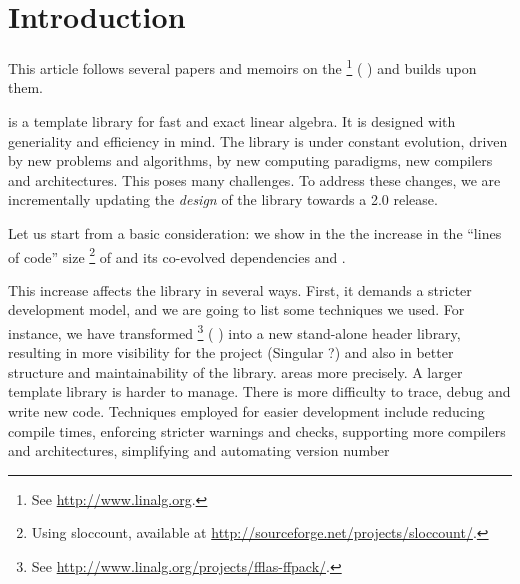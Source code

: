 \section{Introduction}
%
This article follows several papers and memoirs on the \linbox%
%
\footnote{See \url{http://www.linalg.org}.}
%
(\cf{} \cite{Giorgi:2004:these,Turner:2002:these,Boyer:2012:these,Dumas:2002:icms,Dumas:2010:lbpar})
and builds upon them.

\linbox is a \cpp template library for fast and exact linear algebra. It is designed with generiality
and efficiency in mind.
%
%
The \linbox library is under constant evolution, driven by new problems and
algorithms, by new computing paradigms, new compilers and architectures. This
poses many challenges. To address these changes, we are incrementally
updating the \emph{design} of the library towards a \textsf{2.0} release.
%
\par
%
Let us start from a basic consideration: we show in the  the
increase in the ``lines of code'' size
%
\footnote{Using \textsf{sloccount}, available at
\url{http://sourceforge.net/projects/sloccount/}.}
%
of \linbox and its co-evolved dependencies \givaro and \fflasffpack.
%
%

%
This increase affects the library in several ways.  First, it demands a
stricter development model, and we are going to list some techniques we used.
For instance, we have transformed \fflasffpack %
%
\footnote{See \url{http://www.linalg.org/projects/fflas-ffpack/}.}
(\cf{} \cite{Dumas:2008:Flas}) into a new stand-alone header library, resulting
in more visibility for the \fflasffpack project (Singular ?) and also in better
structure and maintainability of the library.%
areas more precisely.
%
%
A larger template library is harder to manage. There is more difficulty
to trace, debug and write new code. Techniques employed
for easier development include reducing
compile times, enforcing stricter warnings and checks, supporting more
compilers and architectures, simplifying and automating version number
